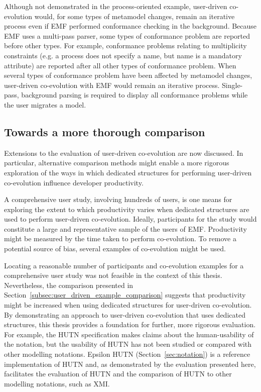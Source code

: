 Although not demonstrated in the process-oriented example, user-driven co-evolution would, for some types of metamodel changes, remain an iterative process even if EMF performed conformance checking in the background. Because EMF uses a multi-pass parser, some types of conformance problem are reported before other types. For example, conformance problems relating to multiplicity constraints (e.g. a process does not specify a name, but name is a mandatory attribute) are reported after all other types of conformance problem. When several types of conformance problem have been affected by metamodel changes, user-driven co-evolution with EMF would remain an iterative process. Single-pass, background parsing is required to display all conformance problems while the user migrates a model.

\subsection{Towards a more thorough comparison}
\label{subsec:user_driven_further_work}
Extensions to the evaluation of user-driven co-evolution are now discussed. In particular, alternative comparison methods might enable a more rigorous exploration of the ways in which dedicated structures for performing user-driven co-evolution influence developer productivity.

A comprehensive user study, involving hundreds of users, is one means for exploring the extent to which productivity varies when dedicated structures are used to perform user-driven co-evolution. Ideally, participants for the study would constitute a large and representative sample of the users of EMF. Productivity might be measured by the time taken to perform co-evolution. To remove a potential source of bias, several examples of co-evolution might be used.



Locating a reasonable number of participants and co-evolution examples for a comprehensive user study was not feasible in the context of this thesis. Nevertheless, the comparison presented in Section~\ref{subsec:user_driven_example_comparison} suggests that productivity might be increased when using dedicated structures for user-driven co-evolution. By demonstrating an approach to user-driven co-evolution that uses dedicated structures, this thesis provides a foundation for further, more rigorous evaluation. For example, the HUTN specification \cite{hutn} makes claims about the human-usability of the notation, but the usability of HUTN has not been studied or compared with other modelling notations. Epsilon HUTN (Section~\ref{sec:notation}) is a reference implementation of HUTN and, as demonstrated by the evaluation presented here, facilitates the evaluation of HUTN and the comparison of HUTN to other modelling notations, such as XMI.


